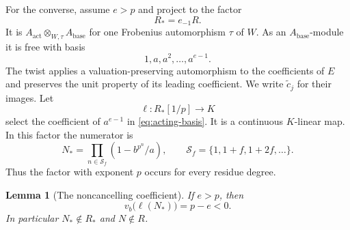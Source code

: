 \documentclass[11pt]{article}
\newtheorem{lemma}[theorem]{Lemma}
\theoremstyle{definition}\newtheorem{definition}[theorem]{Definition}
\theoremstyle{remark}\newtheorem{remark}[theorem]{Remark}
\newcommand{\act}{\mathrm{act}}
\newcommand{\base}{\mathrm{base}}
\begin{document}
For the converse, assume $e>p$ and project to the factor
\[
 R_*=e_{-1}R.
\]
It is $A_{\act}\otimes_{W,\tau}A_{\base}$ for one Frobenius automorphism $\tau$ of $W$. As an $A_{\base}$-module it is free with basis
\begin{equation}\label{eq:acting-basis}
 1,a,a^2,\ldots,a^{e-1}.
\end{equation}
The twist applies a valuation-preserving automorphism to the coefficients of $E$ and preserves the unit property of its leading coefficient. We write $\widetilde c_j$ for their images. Let
\[
 \ell:R_*[1/p]\longrightarrow K
\]
select the coefficient of $a^{e-1}$ in \eqref{eq:acting-basis}. It is a continuous $K$-linear map. In this factor the numerator is
\begin{equation}\label{eq:Nstar}
 N_* =\prod_{n\in\mathcal S_f}(1-b^{p^n}/a),
 \qquad \mathcal S_f=\{1,1+f,1+2f,\ldots\}.
\end{equation}
Thus the factor with exponent $p$ occurs for every residue degree.

\begin{lemma}[The noncancelling coefficient]\label{lem:necessity}
If $e>p$, then
\begin{equation}\label{eq:exact-valuation}
 v_b\bigl(\ell(N_*)\bigr)=p-e<0.
\end{equation}
In particular $N_*\notin R_*$ and $N\notin R$.
\end{lemma}
\end{document}
